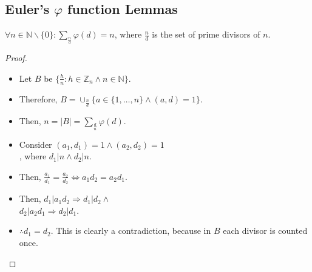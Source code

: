 \subsection{Euler's $\varphi$ function Lemmas}
\begin{lemma}
    $\forall n \in \mathbb{N} \backslash \{0\}: \sum_{\frac{n}{d}} \varphi(d) = n$, where $\frac{n}{d}$ is the set of prime divisors of $n$.\newline
\end{lemma}
\begin{proof}
    \begin{itemize}
        \item Let $B$ be $\{\frac{h}{n}: h \in \mathbb{Z}_{n} \land n \in \mathbb{N} \}$.
        \item Therefore, $B = \cup_{\frac{n}{d}}\{a \in \{1, \dots, n\} \land (a,d) = 1\}$.
        \item Then, $n = |B| = \sum_{\frac{d}{n}} \varphi(d)$.
        \item Consider $(a_{1}, d_{1}) = 1 \land (a_{2}, d_{2}) = 1$\\, where $d_{1}|n \land d_{2}|n$.
        \item Then, $\frac{a_{1}}{d_{1}} = \frac{a_{2}}{d_{2}} \iff a_{1}d_{2} = a_{2}d_{1}$.
        \item Then, $d_{1}|a_{1}d_{2} \Rightarrow d_{1}|d_{2} \land$\\
        $d_{2}|a_{2}d_{1} \Rightarrow d_{2}|d_{1}$.
        \item $\therefore d_{1} = d_{2}$. This is clearly a contradiction, because in $B$ each divisor is counted once.
    \end{itemize}
\end{proof}

